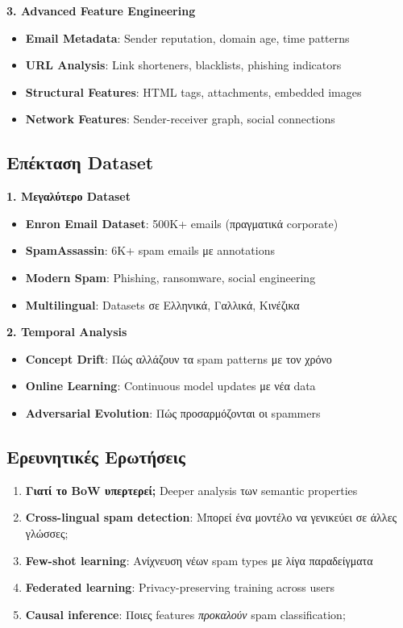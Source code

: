 \documentclass[12pt,a4paper,twoside]{book}
\begin{document}
\textbf{3. Advanced Feature Engineering}

\begin{itemize}
    \item \textbf{Email Metadata}: Sender reputation, domain age, time patterns
    \item \textbf{URL Analysis}: Link shorteners, blacklists, phishing indicators
    \item \textbf{Structural Features}: HTML tags, attachments, embedded images
    \item \textbf{Network Features}: Sender-receiver graph, social connections
\end{itemize}

\subsection{Επέκταση Dataset}

\textbf{1. Μεγαλύτερο Dataset}

\begin{itemize}
    \item \textbf{Enron Email Dataset}: 500K+ emails (πραγματικά corporate)
    \item \textbf{SpamAssassin}: 6K+ spam emails με annotations
    \item \textbf{Modern Spam}: Phishing, ransomware, social engineering
    \item \textbf{Multilingual}: Datasets σε Ελληνικά, Γαλλικά, Κινέζικα
\end{itemize}

\textbf{2. Temporal Analysis}

\begin{itemize}
    \item \textbf{Concept Drift}: Πώς αλλάζουν τα spam patterns με τον χρόνο
    \item \textbf{Online Learning}: Continuous model updates με νέα data
    \item \textbf{Adversarial Evolution}: Πώς προσαρμόζονται οι spammers
\end{itemize}

\subsection{Ερευνητικές Ερωτήσεις}

\begin{enumerate}
    \item \textbf{Γιατί το BoW υπερτερεί;} Deeper analysis των semantic properties
    \item \textbf{Cross-lingual spam detection}: Μπορεί ένα μοντέλο να γενικεύει σε άλλες γλώσσες;
    \item \textbf{Few-shot learning}: Ανίχνευση νέων spam types με λίγα παραδείγματα
    \item \textbf{Federated learning}: Privacy-preserving training across users
    \item \textbf{Causal inference}: Ποιες features \textit{προκαλούν} spam classification;
\end{enumerate}
\end{document}
